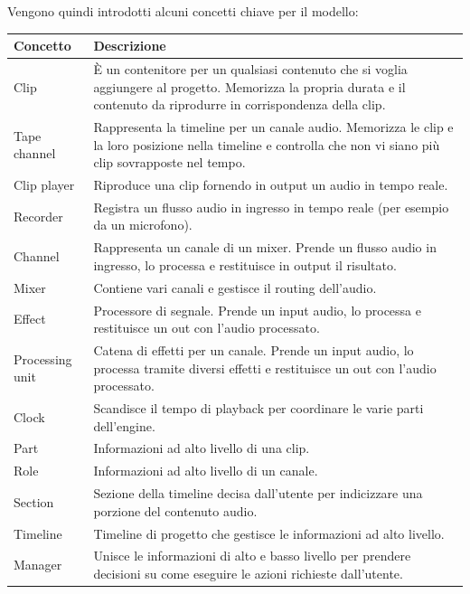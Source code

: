\documentclass[a4paper,12pt]{report}
\begin{document}
\parskip 0.8in
Vengono quindi introdotti alcuni concetti chiave per il modello:
\parskip 0in

\begin{center}
\begin{longtable}{| m{7em} | m{7cm} |} 
 \hline
 Concetto & Descrizione \\ [0.5ex] 
 \hline
 Clip & È un contenitore per un qualsiasi contenuto che si voglia aggiungere al progetto. Memorizza la propria durata e il contenuto da riprodurre in corrispondenza della clip. \\ 
 \hline
 Tape channel & Rappresenta la timeline per un canale audio. Memorizza le clip e la loro posizione nella timeline e controlla che non vi siano più clip sovrapposte nel tempo. \\
 \hline
 Clip player & Riproduce una clip fornendo in output un audio in tempo reale. \\
 \hline
 Recorder & Registra un flusso audio in ingresso in tempo reale (per esempio da un microfono). \\
 \hline
 Channel & Rappresenta un canale di un mixer.
Prende un flusso audio in ingresso, lo processa e restituisce in output il risultato. \\ 
 \hline
 Mixer & Contiene vari canali e gestisce il routing dell’audio. \\
 \hline 
 Effect & Processore di segnale. Prende un input audio, lo processa e restituisce un out con l’audio processato. \\
 \hline
 Processing unit & Catena di effetti per un canale. Prende un input audio, lo processa tramite diversi effetti e restituisce un out con l’audio processato. \\
 \hline
 Clock & Scandisce il tempo di playback per coordinare le varie parti dell’engine. \\
 \hline
 Part & Informazioni ad alto livello di una clip. \\
 \hline
 Role & Informazioni ad alto livello di un canale. \\
\hline
Section & Sezione della timeline decisa dall’utente per indicizzare una porzione del contenuto audio. \\
\hline
Timeline & Timeline di progetto che gestisce le informazioni ad alto livello. \\
\hline
Manager & Unisce le informazioni di alto e basso livello per prendere decisioni su come eseguire le azioni richieste dall’utente. \\
\hline
\end{longtable}
\end{center}
\end{document}
